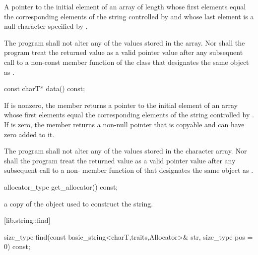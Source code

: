 \begin{itemdescr}
\pnum
\returns A pointer to the initial element of an array of length
 whose first  elements equal the
corresponding elements of the string controlled by 
and whose last element is a null character specified by .

\pnum
\requires
The program shall not alter any of the values stored in the array.
Nor shall the program treat the returned value as a valid pointer
value after any subsequent call to a non-const member function of the
class  that designates the same object as .
\end{itemdescr}

%
\begin{itemdecl}
const charT* data() const;
\end{itemdecl}

\begin{itemdescr}
\pnum
\returns If  is nonzero, the member returns a pointer to the 
initial element of an array whose first  elements equal the
corresponding elements of the string controlled by .
If  is zero, the member returns a non-null pointer that is
copyable and can have zero added to it.

\pnum
\requires
The program shall not alter any of the values stored in the character array.
Nor shall the program treat the returned value as a valid pointer
value after any subsequent call to a non- member function of
 that designates the same object as .
\end{itemdescr}

%
%
\begin{itemdecl}
allocator_type get_allocator() const;
\end{itemdecl}

\begin{itemdescr}
\pnum
\returns
a copy of the
object used to construct the string.
\end{itemdescr}

[lib.string::find]{}

%
%
\begin{itemdecl}
size_type find(const basic_string<charT,traits,Allocator>& str,
               size_type pos = 0) const;
\end{itemdecl}

